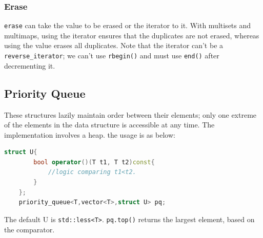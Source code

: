 \documentclass{report}
\begin{document}
\subsubsection{Erase}
\texttt{erase} can take the value to be erased or the iterator to it. With multisets
and multimaps, using the iterator ensures that the duplicates are not erased,
whereas using the value erases all duplicates. Note that the iterator can't be a
\texttt{reverse\_iterator}; we can't use \texttt{rbegin()} and must use
\texttt{end()} after decrementing it. 
\subsection{Priority Queue}
These structures lazily maintain order between their elements; only 
one extreme of the elements in the data structure is accessible at 
any time. The implementation involves a heap. the usage is as below:
\begin{lstlisting}[caption={Priority Queue},language=C++]
    struct U{
        bool operator()(T t1, T t2)const{
            //logic comparing t1<t2.
        }
    };
    priority_queue<T,vector<T>,struct U> pq;
\end{lstlisting}
The default U is \texttt{std::less<T>}. \texttt{pq.top()} returns
the largest element, based on the comparator.
\end{document}
